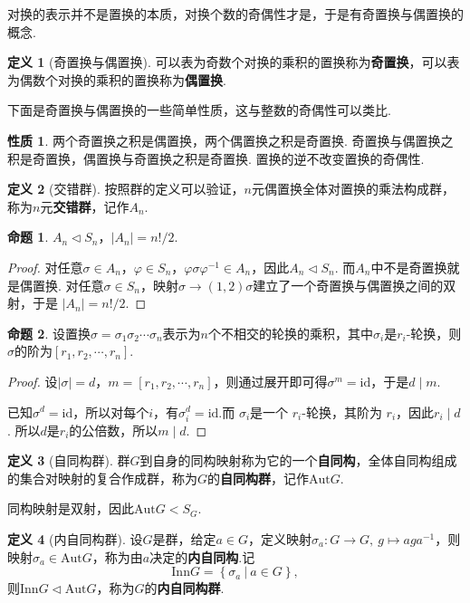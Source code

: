 \documentclass[12pt]{ctexart}
\theoremstyle{definition}
\newtheorem{definition}{定义}[section]
\newtheorem{property}{性质}[section]
\newtheorem{proposition}{命题}[section]
\theoremstyle{plain}
\newcommand{\id}{\mathrm{id}}
\newcommand{\Aut}{\mathrm{Aut}}
\newcommand{\Inn}{\mathrm{Inn}}
\begin{document}
对换的表示并不是置换的本质，对换个数的奇偶性才是，于是有奇置换与偶置换的概念.
\begin{definition}[奇置换与偶置换]
	可以表为奇数个对换的乘积的置换称为\textbf{奇置换}，可以表为偶数个对换的乘积的置换称为\textbf{偶置换}.
\end{definition}
下面是奇置换与偶置换的一些简单性质，这与整数的奇偶性可以类比.
\begin{property}\label{oddeven}
	两个奇置换之积是偶置换，两个偶置换之积是奇置换. 奇置换与偶置换之积是奇置换，偶置换与奇置换之积是奇置换. 置换的逆不改变置换的奇偶性.
\end{property}
\begin{definition}[交错群]
	按照群的定义可以验证，$n$元偶置换全体对置换的乘法构成群，称为$n$元\textbf{交错群}，记作$A_n$.
\end{definition}
\begin{proposition}
	$A_n\lhd S_n$，$|A_n|=n!/2$.
\end{proposition}
\begin{proof}
	对任意$\sigma\in A_n$，$\varphi\in S_n$，$\varphi\sigma\varphi^{-1}\in A_n$，因此$A_n\lhd S_n$. 而$A_n$中不是奇置换就是偶置换. 对任意$\sigma\in S_n$，映射$\sigma\to (1,2)\sigma$建立了一个奇置换与偶置换之间的双射，于是
	$|A_n|=n!/2$.
\end{proof}
\begin{proposition}
	设置换$\sigma=\sigma_1\sigma_2\cdots\sigma_n$表示为$n$个不相交的轮换的乘积，其中$\sigma_i$是$r_i$-轮换，则$\sigma$的阶为$\left[r_1,r_2,\cdots,r_n\right]$.
\end{proposition}
\begin{proof}
	设$|\sigma|=d$，$m=\left[r_1,r_2,\cdots,r_n\right]$，则通过展开即可得$\sigma^m=\id$，于是$d\mid m$. 
	
	已知$\sigma^d = \text{id}$，所以对每个$i$，有$\sigma_i^d = \text{id}$.而 $\sigma_i$是一个 $r_i$-轮换，其阶为 $r_i$，因此$r_i \mid d$. 所以$d$是$r_i$的公倍数，所以$m\mid d$.
\end{proof}
\begin{definition}[自同构群]
	群$G$到自身的同构映射称为它的一个\textbf{自同构}，全体自同构组成的集合对映射的复合作成群，称为$G$的\textbf{自同构群}，记作$\Aut G$.
\end{definition}
同构映射是双射，因此$\Aut G<S_G$.
\begin{definition}[内自同构群]
	设$G$是群，给定$a\in G$，定义映射$\sigma_a:G\to G,\ g\mapsto aga^{-1}$，则映射$\sigma_a\in\Aut G$，称为由$a$决定的\textbf{内自同构}.记
	$$\Inn G=\left\{\sigma_a\ |\ a\in G\right\},$$
	则$\Inn G\lhd\Aut G$，称为$G$的\textbf{内自同构群}.
\end{definition}
\end{document}
